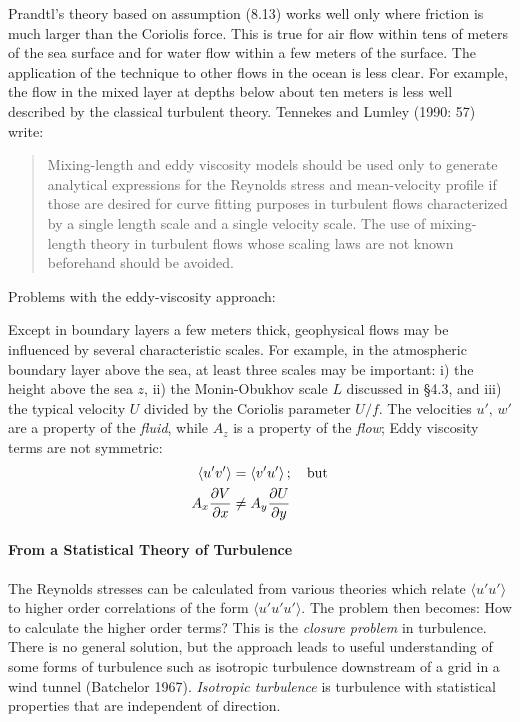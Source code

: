 Prandtl's theory based on assumption (8.13) works well only where friction is much larger than the Coriolis force. This is true for air flow within tens of meters of the sea surface and for water flow within a few meters of the surface. The application of the technique to other flows in the ocean is less clear. For example, the flow in the mixed layer at depths below about ten meters is less well described by the classical turbulent theory. Tennekes and Lumley (1990: 57) write:
\begin{quotation} \small
Mixing-length and eddy viscosity models should be used only to generate
analytical expressions for the Reynolds stress and mean-velocity profile if
those are desired for curve fitting purposes in turbulent flows characterized by
a single length scale and a single velocity scale. The use of mixing-length
theory in turbulent flows whose scaling laws are not known
beforehand should be avoided.
\end{quotation}
Problems with the eddy-viscosity approach:
\begin{enumerate}
\vitem  Except in boundary layers a few meters thick, geophysical flows may be
influenced by several characteristic scales. For example, in the atmospheric
boundary layer above the sea, at least three scales may be important: i) the
height above the sea $z$, ii) the Monin-Obukhov scale $L$ discussed in
\S4.3, and iii) the typical velocity $U$ divided by the Coriolis parameter $U/f$.
\vitem The velocities $u',\,w'$ are a property of the \textit{fluid}, while $A_z$ is a
property of the \textit{flow};
\vitem Eddy viscosity terms are not symmetric:
\begin{align}
\langle u'v' \rangle &= \langle v'u' \rangle\,;\quad \text{but} \notag \\
A_x \frac{\partial{V}}{\partial{x}} &\neq A_y \frac{\partial{U}}{\partial{y}}
\notag
\end{align}
\end{enumerate}

\paragraph{From a Statistical Theory of Turbulence}
The Reynolds stresses can be calculated from various theories which relate $\langle u'u'
\rangle$ to higher order correlations of the form $\langle u'u'u' \rangle$. The problem then
becomes: How to calculate the higher order terms? This is the \textit{closure
problem} in turbulence.
There is no general solution, but the approach leads to useful understanding of some forms of
turbulence such as isotropic turbulence downstream of a grid in a wind tunnel (Batchelor
1967). \textit{Isotropic turbulence} is turbulence with statistical
properties that are independent of direction.

